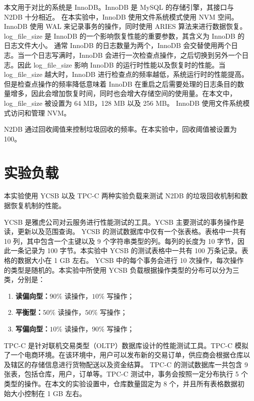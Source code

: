 本文用于对比的系统是 InnoDB。InnoDB 是 MySQL 的存储引擎，其接口与 N2DB 十分相近。
在本实验中，InnoDB 使用文件系统模式使用 NVM 空间。
InnoDB 使用 WAL 来记录事务的操作，同时使用 ARIES 算法来进行数据恢复。
log\_file\_size 是 InnoDB 的一个影响恢复性能的重要参数，其含义为 InnoDB 的日志文件大小。
通常 InnoDB 的日志数量为两个，InnoDB 会交替使用两个日志。当一个日志写满时，InnoDB 会进行一次检查点操作，之后切换到另外一个日志。因此 log\_file\_size 影响 InnoDB 的运行时性能以及恢复时的性能。当 log\_file\_size 越大时，InnoDB 进行检查点的频率越低，系统运行时的性能提高。但是检查点操作的频率降低意味着 InnoDB 在重启之后需要处理的日志条目的数量增多，因此会增加恢复时间，同时也会增大存储空间的使用量。在本文中，log\_file\_size 被设置为 64 MB，128 MB 以及 256 MB。
InnoDB 使用文件系统模式访问和管理 NVM。

N2DB 通过回收阈值来控制垃圾回收的频率。在本实验中，回收阈值被设置为 100。

\section{实验负载}

本实验使用 YCSB 以及 TPC-C 两种实验负载来测试 N2DB 的垃圾回收机制和数据恢复机制的性能。

YCSB 是雅虎公司对云服务进行性能测试的工具\cite{cooper2010benchmarking}。YCSB 主要测试的事务操作是读，更新以及范围查询。
YCSB 的测试数据库中仅有一个张表格。表格中一共有 10 列，其中包含一个主键以及 9 个字符串类型的列。每列的长度为 10 字节，因此一条记录为 100 字节。本实验中 YCSB 的测试表格中一共有 100 万条记录。表格的数据大小在 1 GB 左右。
YCSB 中的每个事务会进行 10 次操作，每次操作的类型是随机的。本实验中所使用 YCSB 负载根据操作类型的分布可以分为三类，分别是：
\begin{enumerate}
    \item \textbf{读偏向型：}$90\%$ 读操作，$10\%$ 写操作；
    \item \textbf{平衡型：}$50\%$ 读操作，$50\%$ 写操作；
    \item \textbf{写偏向型：}$10\%$ 读操作，$90\%$ 写操作；
\end{enumerate}


TPC-C 是针对联机交易类型（OLTP）数据库设计的性能测试工具。TPC-C 模拟了一个电商环境。在该环境中，用户可以发布新的交易订单，供应商会根据仓库以及辖区的存储信息进行货物配送以及资金结算。
TPC-C 的测试数据库一共包含 9 张表，包括仓库，用户，订单等。TPC-C 测试中，事务会按照一定分布执行 5 个类型的操作。在本文的实验设置中，仓库数量固定为 8 个，并且所有表格数据初始大小控制在 1 GB 左右。

